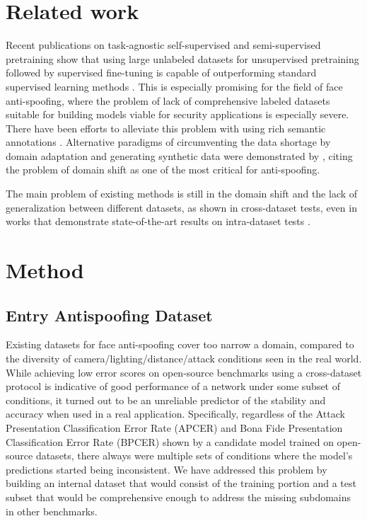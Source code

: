 \documentclass[10pt,twocolumn,letterpaper]{article}
\begin{document}
\section{Related work}

Recent publications on task-agnostic self-supervised and semi-supervised pretraining show that using large unlabeled datasets for unsupervised pretraining followed by supervised fine-tuning is capable of outperforming standard supervised learning methods \cite{big-self-supervised} \cite{SEER}. This is especially promising for the field of face anti-spoofing, where the problem of lack of comprehensive labeled datasets suitable for building models viable for security applications is especially severe. There have been efforts to alleviate this problem with using rich semantic annotations \cite{CelebA-Spoof}. Alternative paradigms of circumventing the data shortage by domain adaptation and generating synthetic data were demonstrated by \cite{GFA-CNN} \cite{3d-synth}, citing the problem of domain shift as one of the most critical for anti-spoofing. 

The main problem of existing methods is still in the domain shift and the lack of generalization between different datasets, as shown in cross-dataset tests, even in works that demonstrate state-of-the-art results on intra-dataset tests \cite{GFA-CNN} \cite{3d-synth} \cite{CNN-LSTM} \cite{CDCNN}. 

\section{Method}

\subsection{Entry Antispoofing Dataset}

Existing datasets for face anti-spoofing cover too narrow a domain, compared to the diversity of camera/lighting/distance/attack conditions seen in the real world. While achieving low error scores on open-source benchmarks using a cross-dataset protocol is indicative of good performance of a network under some subset of conditions, it turned out to be an unreliable predictor of the stability and accuracy when used in a real application. Specifically, regardless of the Attack Presentation Classification Error Rate (APCER) and Bona Fide Presentation Classification Error Rate (BPCER) shown by a candidate model trained on open-source datasets, there always were multiple sets of conditions where the model's predictions started being inconsistent. We have addressed this problem by building an internal dataset that would consist of the training portion and a test subset that would be comprehensive enough to address the missing subdomains in other benchmarks.
\end{document}
